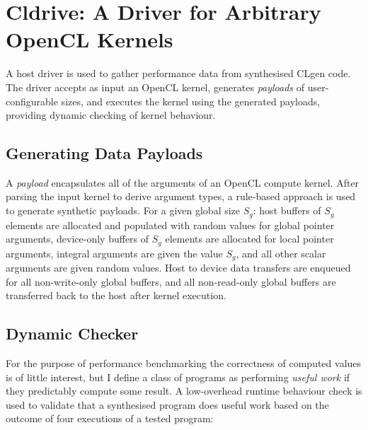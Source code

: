 \section{Cldrive: A Driver for Arbitrary OpenCL Kernels}
\label{sec:cldrive}

A host driver is used to gather performance data from synthesised CLgen code. The driver accepts as input an OpenCL kernel, generates \emph{payloads} of user-configurable sizes, and executes the kernel using the generated payloads, providing dynamic checking of kernel behaviour.

\subsection{Generating Data Payloads}

A \emph{payload} encapsulates all of the arguments of an OpenCL compute kernel. After parsing the input kernel to derive argument types, a rule-based approach is used to generate synthetic payloads. For a given global size $S_g$: host buffers of $S_g$ elements are allocated and populated with random values for global pointer arguments, device-only buffers of $S_g$ elements are allocated for local pointer arguments, integral arguments are given the value $S_g$, and all other scalar arguments are given random values. Host to device data transfers are enqueued for all non-write-only global buffers, and all non-read-only global buffers are transferred back to the host after kernel execution.

\subsection{Dynamic Checker}

For the purpose of performance benchmarking the correctness of computed values is of little interest, but I define a class of programs as performing \emph{useful work} if they predictably compute some result. A low-overhead runtime behaviour check is used to validate that a synthesised program does useful work based on the outcome of four executions of a tested program:

